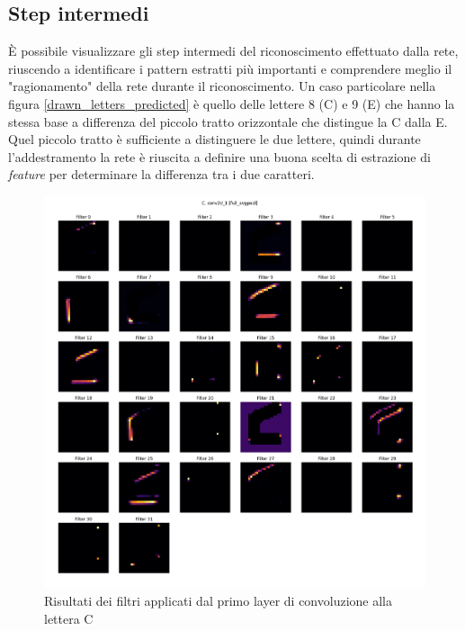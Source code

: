 \documentclass[a4paper,12pt]{article}
\begin{document}
\subsection{Step intermedi}
È possibile visualizzare gli step intermedi del riconoscimento effettuato dalla rete, riuscendo a identificare i pattern estratti più importanti e comprendere meglio il "ragionamento" della rete durante il riconoscimento.
Un caso particolare nella figura \ref{drawn_letters_predicted} è quello delle lettere 8 (C) e 9 (E) che hanno la stessa base a differenza del piccolo tratto orizzontale che distingue la C dalla E. Quel piccolo tratto è sufficiente a distinguere le due lettere, quindi durante l'addestramento la rete è riuscita a definire una buona scelta di estrazione di \textit{feature} per determinare la differenza tra i due caratteri.

\begin{figure}[H]
\centering
\includegraphics[width=1\linewidth]{images/C_full_avgpool_layer_0.png}
\caption{Risultati dei filtri applicati dal primo layer di convoluzione alla lettera C}
\label{first_layer_filters_C}
\end{figure}
\end{document}
